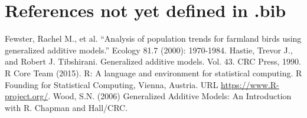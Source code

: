 \documentclass[]{article}
\begin{document}
\endgroup{}

\section{References not yet defined in
.bib}\label{references-not-yet-defined-in-.bib}

Fewster, Rachel M., et al. ``Analysis of population trends for farmland
birds using generalized additive models.'' Ecology 81.7 (2000):
1970-1984. Hastie, Trevor J., and Robert J. Tibshirani. Generalized
additive models. Vol. 43. CRC Press, 1990. R Core Team (2015). R: A
language and environment for statistical computing. R Founding for
Statistical Computing, Vienna, Austria. URL
\url{https://www.R-project.org/}. Wood, S.N. (2006) Generalized Additive
Models: An Introduction with R. Chapman and Hall/CRC.
\end{document}
